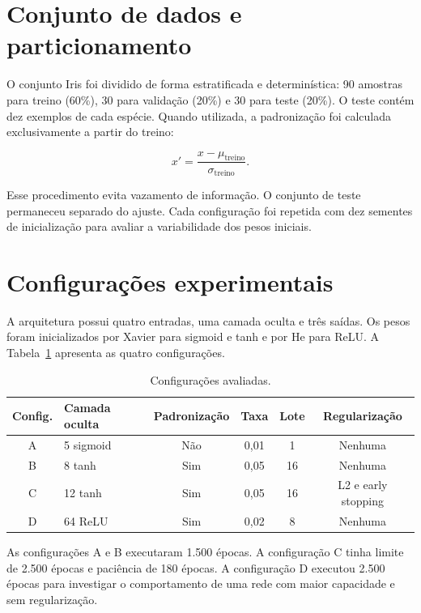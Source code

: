 \documentclass[12pt,a4paper,oneside,openany,chapter=TITLE,section=TITLE,subsection=TITLE,brazil]{abntex2}
\newcommand{\pct}[1]{#1\%}
\begin{document}
\section{Conjunto de dados e particionamento}

O conjunto Iris foi dividido de forma estratificada e determinística: 90 amostras para treino (\pct{60}), 30 para validação (\pct{20}) e 30 para teste (\pct{20}). O teste contém dez exemplos de cada espécie. Quando utilizada, a padronização foi calculada exclusivamente a partir do treino:

\begin{equation}
  x' = \frac{x-\mu_{\mathrm{treino}}}{\sigma_{\mathrm{treino}}}.
\end{equation}

Esse procedimento evita vazamento de informação. O conjunto de teste permaneceu separado do ajuste. Cada configuração foi repetida com dez sementes de inicialização para avaliar a variabilidade dos pesos iniciais.

\section{Configurações experimentais}

A arquitetura possui quatro entradas, uma camada oculta e três saídas. Os pesos foram inicializados por Xavier para sigmoid e tanh e por He para ReLU. A Tabela~\ref{tab:configs} apresenta as quatro configurações.

\begin{table}[H]
\centering
\caption{Configurações avaliadas.}
\label{tab:configs}
\small
\begin{tabular}{clcccc}
\toprule
\textbf{Config.} & \textbf{Camada oculta} & \textbf{Padronização} & \textbf{Taxa} & \textbf{Lote} & \textbf{Regularização} \\
\midrule
A & 5 sigmoid & Não & 0,01 & 1 & Nenhuma \\
B & 8 tanh & Sim & 0,05 & 16 & Nenhuma \\
C & 12 tanh & Sim & 0,05 & 16 & L2 e early stopping \\
D & 64 ReLU & Sim & 0,02 & 8 & Nenhuma \\
\bottomrule
\end{tabular}
\end{table}

As configurações A e B executaram 1.500 épocas. A configuração C tinha limite de 2.500 épocas e paciência de 180 épocas. A configuração D executou 2.500 épocas para investigar o comportamento de uma rede com maior capacidade e sem regularização.
\end{document}
